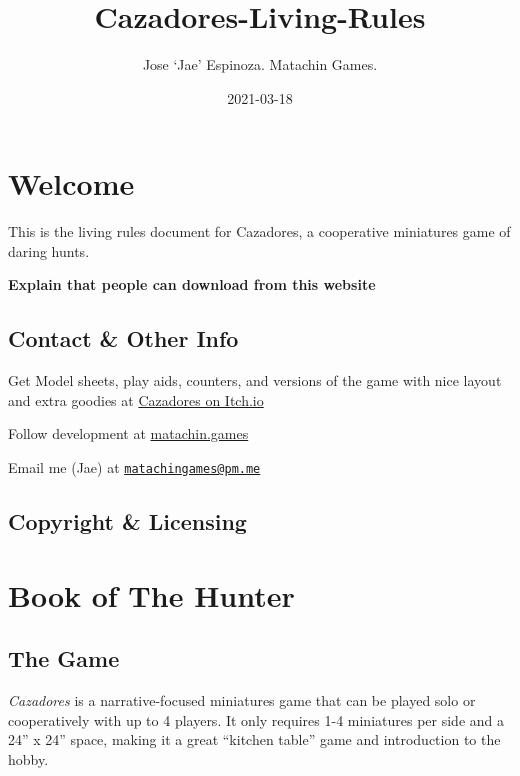 \documentclass[
]{book}
\title{Cazadores-Living-Rules}
\author{Jose `Jae' Espinoza. Matachin Games.}
\date{2021-03-18}
\begin{document}
\maketitle

{
\setcounter{tocdepth}{1}
\tableofcontents
}
\hypertarget{welcome}{%
\chapter{Welcome}\label{welcome}}

This is the living rules document for Cazadores, a cooperative miniatures game of daring hunts.

\textbf{Explain that people can download from this website}

\hypertarget{contact-other-info}{%
\section{Contact \& Other Info}\label{contact-other-info}}

Get Model sheets, play aids, counters, and versions of the game with nice layout and extra goodies at \href{https://matachingames.itch.io/cazadores}{Cazadores on Itch.io}

Follow development at \href{https://matachin.games}{matachin.games}

Email me (Jae) at \href{mailto:matachingames@pm.me}{\nolinkurl{matachingames@pm.me}}

\hypertarget{copyright-licensing}{%
\section{Copyright \& Licensing}\label{copyright-licensing}}

\hypertarget{hunterintro}{%
\chapter{Book of The Hunter}\label{hunterintro}}

\hypertarget{the-game}{%
\section{The Game}\label{the-game}}

\emph{Cazadores} is a narrative-focused miniatures game that can be played solo or cooperatively with up to 4 players. It only requires 1-4 miniatures per side and a 24'' x 24'' space, making it a great ``kitchen table'' game and introduction to the hobby.
\end{document}
